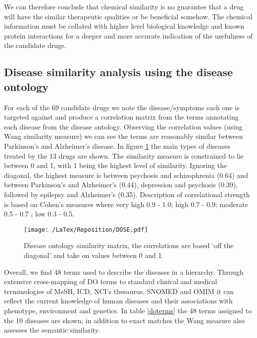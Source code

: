 \documentclass[preprint,11pt]{elsarticle}
\begin{document}
We can therefore conclude that chemical similarity is no guarantee that a drug will have the similar therapeutic qualities or be beneficial somehow. The chemical information must be collated with higher level biological knowledge and known protein interactions for a deeper and more accurate indication of the usefulness of the candidate drugs.  


\subsection{Disease similarity analysis using the disease ontology}
For each of the 69 candidate drugs we note the disease/symptoms each one is targeted against and produce a correlation  matrix from the terms annotating each disease from the disease ontology. Observing the correlation values (using Wang similarity measure) we can see the terms are reasonably similar between Parkinson's and Alzheimer's disease. In figure \ref{dose1} the main types of diseases treated by the 13 drugs are shown. The similarity measure is constrained to lie between 0 and 1, with 1 being the highest level of similarity. Ignoring the diagonal, the highest measure is between psychosis and schizophrenia (0.64) and between Parkinson's and Alzheimer's (0.44), depression and psychosis (0.39), followed by epilepsy and Alzheimer's (0.35). Description of correlational strength is based on Cohen's measures where very high 0.9 - 1.0; high 0.7 - 0.9; moderate 0.5 - 0.7 ; low 0.3 - 0.5.


\begin{figure}[h]
  \begin{center}
	 \texttt{[image: /LaTex/Reposition/DOSE.pdf]} %
  \end{center}
 \caption{Disease ontology similarity matrix, the correlations are based `off the diagonal' and take on values between 0 and 1.}
\label{dose1}
\end{figure}

Overall, we find 48 terms used to describe the diseases  in a hierarchy. Through extensive cross-mapping of DO terms to standard clinical and medical terminologies of MeSH, ICD, NCI's thesaurus, SNOMED and OMIM it can reflect the current knowledge of human diseases and their associations with phenotype, environment and genetics.  In table \ref{doterms} the 48 terms assigned to the 10 diseases are shown, in addition to exact matches the Wang measure also assesses the semantic similarity.
\end{document}
